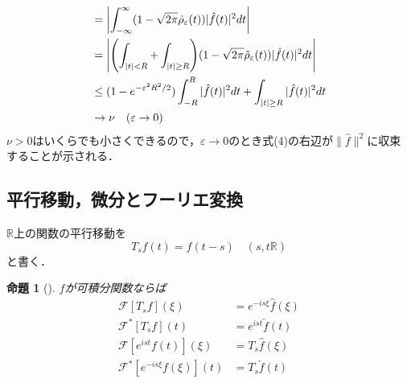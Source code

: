 \documentclass[dvipdfmx,a4j,10pt]{jsarticle}
\makeatletter
\theoremstyle{mystyle1}
\newtheorem{proposition}[theorem]{命題}
\theoremstyle{mystyle3}
\theoremstyle{mystyle4}
\theoremstyle{mystyle6}
\theoremstyle{mystyle2}
\theoremstyle{mystyle5}
\renewenvironment{proof}[1][\proofname]{\par
  \pushQED{\qed}%
  \normalfont
  \topsep6\p@\@plus6\p@ \trivlist
  \item[\hskip\labelsep{\bfseries\sffamily #1}]\ignorespaces
}{%
  \popQED\endtrivlist\@endpefalse
}
\renewcommand\proofname{証明}
\newenvironment{prop}[1][]
{\begin{tcolorbox}[
    enhanced,
    boxrule=0pt,
    arc=0mm,
    frame hidden,
    borderline west={2pt}{-4pt}{blue!50!black},
    breakable = true
    ]
    \begin{proposition}[#1]
}
{\end{proposition}\end{tcolorbox}}
\makeatother
\begin{document}
\begin{proof}
\[\begin{split}
			&=\mleft|\int_{-\infty}^\infty (1-\sqrt{2\pi}\hat\rho_\varepsilon(t))|\hat f(t)|^2dt\mright| \\
			&=\mleft|\mleft(\int_{|t|<R}+\int_{|t|\geq R}\mright)(1-\sqrt{2\pi}\hat\rho_\varepsilon(t))|\hat f(t)|^2dt\mright| \\
			&\leq (1-e^{-\varepsilon^2R^2/2})\int_{-R}^R|\hat f(t)|^2dt+\int_{|t|\geq R}|\hat f(t)|^2dt \\
			&\to\nu\quad(\varepsilon\to 0)
		\end{split}
	\]
	$\nu>0$はいくらでも小さくできるので，$\varepsilon\to 0$のとき式(4)の右辺が$\|\hat f\|^2$に収束することが示される．
\end{proof}

\subsection{平行移動，微分とフーリエ変換}

$\mathbb{R}$上の関数の平行移動を
\[
	T_sf(t)=f(t-s)\quad(s,t\mathbb{R})
\]
と書く．

\begin{prop}\label{prop:3-8}
	$f$が可積分関数ならば
	\[
		\begin{split}
			\mathcal{F}[T_sf](\xi)&=e^{-is\xi}\hat f(\xi) \\
			\mathcal{F}^*[T_sf](t)&=e^{ist}\check f(t) \\
			\mathcal{F}[e^{ist}f(t)](\xi)&=T_s\hat f(\xi) \\
			\mathcal{F}^*[e^{-is\xi}f(\xi)](t)&=T_s\check f(t)
		\end{split}
	\]
\end{prop}
\end{document}
